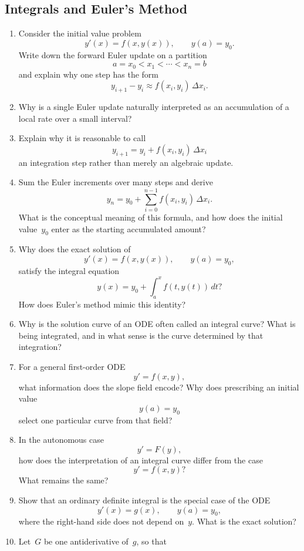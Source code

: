 \subsection{Integrals and Euler's Method}

\begin{enumerate}[resume]
  \item Consider the initial value problem
    \[
      y'(x)=f(x,y(x)), \qquad y(a)=y_0.
    \]
    Write down the forward Euler update on a partition
    \[
      a=x_0<x_1<\cdots<x_n=b
    \]
    and explain why one step has the form
    \[
      y_{i+1}-y_i \approx f(x_i,y_i)\,\Delta x_i.
    \]
  \item Why is a single Euler update naturally interpreted as an accumulation of a local rate over a small interval?
  \item Explain why it is reasonable to call
    \[
      y_{i+1}=y_i+f(x_i,y_i)\,\Delta x_i
    \]
    an integration step rather than merely an algebraic update.
  \item Sum the Euler increments over many steps and derive
    \[
      y_n
      =
      y_0+\sum_{i=0}^{n-1} f(x_i,y_i)\,\Delta x_i.
    \]
    What is the conceptual meaning of this formula, and how does the initial value~\(y_0\) enter as the starting accumulated amount?
  \item Why does the exact solution of
    \[
      y'(x)=f(x,y(x)), \qquad y(a)=y_0,
    \]
    satisfy the integral equation
    \[
      y(x)=y_0+\int_a^x f(t,y(t))\,dt?
    \]
    How does Euler's method mimic this identity?
  \item Why is the solution curve of an ODE often called an integral curve?
    What is being integrated, and in what sense is the curve determined by that integration?
  \item For a general first-order ODE
    \[
      y'=f(x,y),
    \]
    what information does the slope field encode?
    Why does prescribing an initial value
    \[
      y(a)=y_0
    \]
    select one particular curve from that field?
  \item In the autonomous case
    \[
      y'=F(y),
    \]
    how does the interpretation of an integral curve differ from the case
    \[
      y'=f(x,y)?
    \]
    What remains the same?
  \item Show that an ordinary definite integral is the special case of the ODE
    \[
      y'(x)=g(x), \qquad y(a)=y_0,
    \]
    where the right-hand side does not depend on~\(y\).
    What is the exact solution?
  \item Let~\(G\) be one antiderivative of~\(g\), so that

\end{enumerate}
